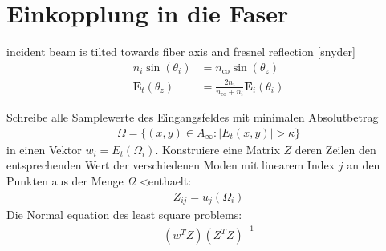 \documentclass{article}
\newcommand{\vect}[1]{\mathbf{#1}}
\def\E{\vect E}
\newcommand{\nco}{n_\textrm{co}}
\newcommand{\Ainfty}{A_\infty}
\begin{document}
\section{Einkopplung in die Faser}
incident beam is tilted towards fiber axis
and fresnel reflection 
[snyder]
\begin{align}
n_i \sin(\theta_i) &= \nco \sin(\theta_z)\\
\E_t(\theta_z) &= \frac{2 n_i}{\nco+n_i} \E_i(\theta_i)
\end{align}

Schreibe alle Samplewerte des Eingangsfeldes mit minimalen
Absolutbetrag
\begin{align}
  \Omega = \{(x,y)\in\Ainfty: |E_t(x,y)| > \kappa\}
\end{align}
in einen Vektor $w_i = E_t(\Omega_i)$. Konstruiere eine Matrix $Z$
deren Zeilen den entsprechenden Wert der verschiedenen Moden mit
linearem Index $j$ an den Punkten aus der Menge $\Omega$ <enthaelt:
\begin{align}
  Z_{ij} = u_j(\Omega_i) 
\end{align}
Die Normal equation des least square problems:
\begin{align}
(w^T Z) (Z^T Z)^{-1}
\end{align}
\end{document}
